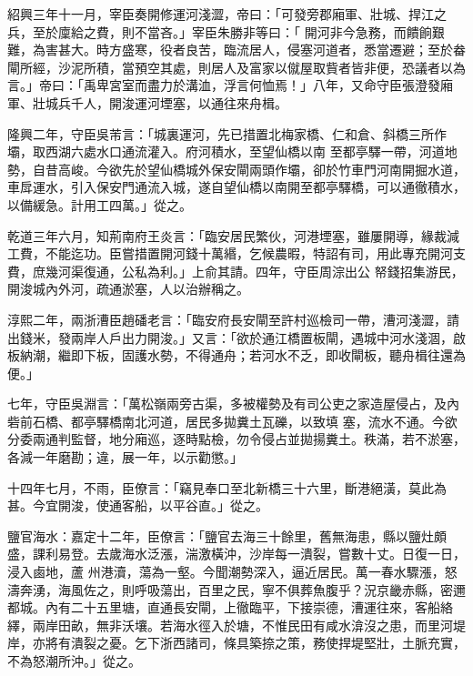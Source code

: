 \begin{pinyinscope}
 紹興三年十一月，宰臣奏開修運河淺澀，帝曰：「可發旁郡廂軍、壯城、捍江之兵，至於廩給之費，則不當吝。」宰臣朱勝非等曰：「
 開河非今急務，而饋餉艱難，為害甚大。時方盛寒，役者良苦，臨流居人，侵塞河道者，悉當遷避；至於畚閘所經，沙泥所積，當預空其處，則居人及富家以僦屋取貲者皆非便，恐議者以為言。」帝曰：「禹卑宮室而盡力於溝洫，浮言何恤焉！」八年，又命守臣張澄發廂軍、壯城兵千人，開浚運河堙塞，以通往來舟楫。



 隆興二年，守臣吳芾言：「城裏運河，先已措置北梅家橋、仁和倉、斜橋三所作壩，取西湖六處水口通流灌入。府河積水，至望仙橋以南
 至都亭驛一帶，河道地勢，自昔高峻。今欲先於望仙橋城外保安閘兩頭作壩，卻於竹車門河南開掘水道，車戽運水，引入保安門通流入城，遂自望仙橋以南開至都亭驛橋，可以通徹積水，以備緩急。計用工四萬。」從之。



 乾道三年六月，知荊南府王炎言：「臨安居民繁伙，河港堙塞，雖屢開導，緣裁減工費，不能迄功。臣嘗措置開河錢十萬緡，乞候農暇，特詔有司，用此專充開河支費，庶幾河渠復通，公私為利。」上俞其請。四年，守臣周淙出公
 帑錢招集游民，開浚城內外河，疏通淤塞，人以治辦稱之。



 淳熙二年，兩浙漕臣趙磻老言：「臨安府長安閘至許村巡檢司一帶，漕河淺澀，請出錢米，發兩岸人戶出力開浚。」又言：「欲於通江橋置板閘，遇城中河水淺涸，啟板納潮，繼即下板，固護水勢，不得通舟；若河水不乏，即收閘板，聽舟楫往還為便。」



 七年，守臣吳淵言：「萬松嶺兩旁古渠，多被權勢及有司公吏之家造屋侵占，及內砦前石橋、都亭驛橋南北河道，居民多拋糞土瓦礫，以致填
 塞，流水不通。今欲分委兩通判監督，地分廂巡，逐時點檢，勿令侵占並拋揚糞土。秩滿，若不淤塞，各減一年磨勘；違，展一年，以示勸懲。」



 十四年七月，不雨，臣僚言：「竊見奉口至北新橋三十六里，斷港絕潢，莫此為甚。今宜開浚，使通客船，以平谷直。」從之。



 鹽官海水：嘉定十二年，臣僚言：「鹽官去海三十餘里，舊無海患，縣以鹽灶頗盛，課利易登。去歲海水泛漲，湍激橫沖，沙岸每一潰裂，嘗數十丈。日復一日，浸入鹵地，蘆
 州港瀆，蕩為一壑。今聞潮勢深入，逼近居民。萬一春水驟漲，怒濤奔湧，海風佐之，則呼吸蕩出，百里之民，寧不俱葬魚腹乎？況京畿赤縣，密邇都城。內有二十五里塘，直通長安閘，上徹臨平，下接崇德，漕運往來，客船絡繹，兩岸田畝，無非沃壤。若海水徑入於塘，不惟民田有咸水渰沒之患，而里河堤岸，亦將有潰裂之憂。乞下浙西諸司，條具築捺之策，務使捍堤堅壯，土脈充實，不為怒潮所沖。」從之。




\end{pinyinscope}
